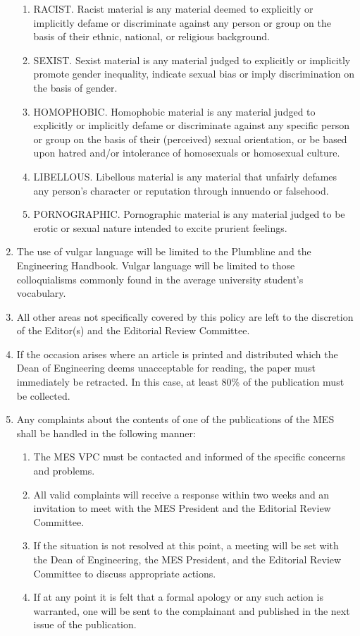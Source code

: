 \begin{enumerate}
  \begin{enumerate}
   \item
    RACIST. Racist material is any material deemed to explicitly or implicitly defame or discriminate against any person or group on the basis of their ethnic, national, or religious background.
   \item
    SEXIST. Sexist material is any material judged to explicitly or implicitly promote gender inequality, indicate sexual bias or imply discrimination on the basis of gender.
   \item
    HOMOPHOBIC. Homophobic material is any material judged to explicitly or implicitly defame or discriminate against any specific person or group on the basis of their (perceived) sexual orientation, or be based upon hatred and/or intolerance of homosexuals or homosexual culture.
   \item
    LIBELLOUS. Libellous material is any material that unfairly defames any person's character or reputation through innuendo or falsehood.
   \item
    PORNOGRAPHIC. Pornographic material is any material judged to be erotic or sexual nature intended to excite prurient feelings.
  \end{enumerate}
 \item
  The use of vulgar language will be limited to the Plumbline and the Engineering Handbook. Vulgar language will be limited to those colloquialisms commonly found in the average university student's vocabulary.
 \item
  All other areas not specifically covered by this policy are left to the discretion of the Editor(s) and the Editorial Review Committee.
 \item
  If the occasion arises where an article is printed and distributed which the Dean of Engineering deems unacceptable for reading, the paper must immediately be retracted. In this case, at least 80\% of the publication must be collected.
 \item
  Any complaints about the contents of one of the publications of the MES shall be handled in the following manner:

  \begin{enumerate}
   \item
    The MES VPC must be contacted and informed of the specific concerns and problems.
   \item
    All valid complaints will receive a response within two weeks and an invitation to meet with the MES President and the Editorial Review Committee.
   \item
    If the situation is not resolved at this point, a meeting will be set with the Dean of Engineering, the MES President, and the Editorial Review Committee to discuss appropriate actions.
   \item
    If at any point it is felt that a formal apology or any such action is warranted, one will be sent to the complainant and published in the next issue of the publication.

  \end{enumerate}
\end{enumerate}

